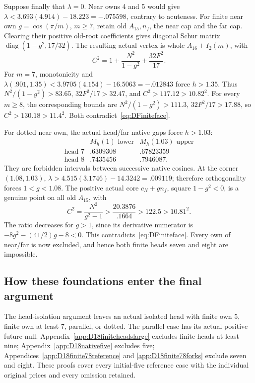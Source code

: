 \documentclass[11pt]{article}
\theoremstyle{definition}
\theoremstyle{remark}
\begin{document}
Suppose finally that \(\lambda=0\).
Near owns 4 and 5 would give
\(\lambda<3.693(4.914)-18.223=-.075598\),
contrary to acuteness.
For finite near own \(g=\cos(\pi/m)\), \(m\ge7\),
retain old \(A_{15},n_f\), the near cap and the far cap.
Clearing their positive old-root coefficients gives diagonal
Schur matrix \(\operatorname{diag}(1-g^2,17/32)\).
The resulting actual vertex is whole \(A_{16}+I_2(m)\), with
\[
                C^2=1+{\frac{N^2}{1-g^2}}+{\frac{32F^2}{17}}.
\]
For \(m=7\), monotonicity and
\(\lambda(.901,1.35)<3.9705(4.154)-16.5063=-.012843\)
force \(h>1.35\).  Thus \(N^2/(1-g^2)>83.65\),
\(32F^2/17>32.47\), and \(C^2>117.12>10.82^2\).
For every \(m\ge8\), the corresponding bounds are
\(N^2/(1-g^2)>111.3\), \(32F^2/17>17.88\),
so \(C^2>130.18>11.4^2\).
Both contradict~\eqref{eq:DFiniteface}.

For dotted near own, the actual head/far native gaps force
\(h>1.03\):
\[
 \begin{array}{c|cc}
 &M_h(1)\text{ lower}&M_h(1.03)\text{ upper}\\ \hline
 \text{head }7&.6309308&.67823359\\
 \text{head }8&.7435456&.7946087 .
 \end{array}
\]
They are forbidden intervals between successive native cosines.
At the corner \((1.08,1.03)\),
\(\lambda>4.515(3.1746)-14.3242=.009119\);
therefore orthogonality forces \(1<g<1.08\).
The positive actual core \(c_N+gn_f\), square \(1-g^2<0\),
is a genuine point on all old \(A_{15}\), with
\[
 C^2={\frac{N^2}{ g^2-1}}>
 {\frac{20.3876}{.1664}}>122.5>10.81^2 .
\]
The ratio decreases for \(g>1\), since its derivative numerator
is \(-8g^2-(41/2)g-8<0\).
This contradicts~\eqref{eq:DFiniteface}.
Every own of near/far is now excluded, and hence both finite
heads seven and eight are impossible.

\subsection{How these foundations enter the final argument}
\label{app:D18foundationcomposition}

The head-isolation argument leaves an actual isolated head with
finite own 5, finite own at least 7, parallel, or dotted.
The parallel case has its actual positive future null.
Appendix~\ref{app:D18finiteheadslarge} excludes finite heads
at least nine; Appendix~\ref{app:D18nativefive} excludes five;
Appendices~\ref{app:D18finite78reference} and
\ref{app:D18finite78forks} exclude seven and eight.
These proofs cover every initial-five reference case with the
individual original prices and every omission retained.
\end{document}
